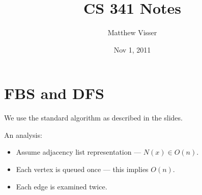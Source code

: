 \documentclass[12pt]{article}
\begin{document}
\title{CS 341 Notes}
\author{Matthew Visser}
\date{Nov  1, 2011}
\maketitle

\section{FBS and DFS}

We use the standard algorithm as described in the slides.

An analysis:
\begin{itemize}
	\item Assume adjacency list representation --- $N(x) \in O(n)$.
	\item Each vertex is queued once --- this implies $O(n)$.
	\item Each edge is examined twice.
\end{itemize}
\end{document}
